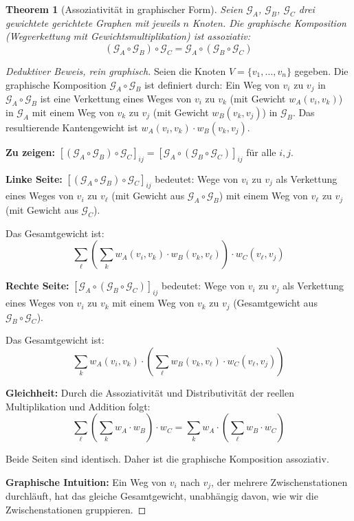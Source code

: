 \documentclass[12pt, a4paper]{article}
\newtheorem{theorem}{Theorem}[section]
\theoremstyle{definition}
\theoremstyle{remark}
\newcommand{\Graph}{\mathcal{G}}
\begin{document}
\begin{theorem}[Assoziativität in graphischer Form]
\label{thm:graph_assoziativitaet}
Seien $\Graph_A$, $\Graph_B$, $\Graph_C$ drei gewichtete gerichtete Graphen mit jeweils $n$ Knoten. Die graphische Komposition (Wegverkettung mit Gewichtsmultiplikation) ist assoziativ:
\[
  (\Graph_A \circ \Graph_B) \circ \Graph_C = \Graph_A \circ (\Graph_B \circ \Graph_C)
\]
\end{theorem}

\begin{proof}[Deduktiver Beweis, rein graphisch]
Seien die Knoten $V = \{v_1, \ldots, v_n\}$ gegeben. Die graphische Komposition $\Graph_A \circ \Graph_B$ ist definiert durch: Ein Weg von $v_i$ zu $v_j$ in $\Graph_A \circ \Graph_B$ ist eine Verkettung eines Weges von $v_i$ zu $v_k$ (mit Gewicht $w_A(v_i, v_k)$) in $\Graph_A$ mit einem Weg von $v_k$ zu $v_j$ (mit Gewicht $w_B(v_k, v_j)$) in $\Graph_B$. Das resultierende Kantengewicht ist $w_A(v_i, v_k) \cdot w_B(v_k, v_j)$.

\textbf{Zu zeigen:} $[(\Graph_A \circ \Graph_B) \circ \Graph_C]_{ij} = [\Graph_A \circ (\Graph_B \circ \Graph_C)]_{ij}$ für alle $i, j$.

\textbf{Linke Seite:} $[(\Graph_A \circ \Graph_B) \circ \Graph_C]_{ij}$ bedeutet: Wege von $v_i$ zu $v_j$ als Verkettung eines Weges von $v_i$ zu $v_\ell$ (mit Gewicht aus $\Graph_A \circ \Graph_B$) mit einem Weg von $v_\ell$ zu $v_j$ (mit Gewicht aus $\Graph_C$).

Das Gesamtgewicht ist:
\[
  \sum_{\ell} \left(\sum_{k} w_A(v_i, v_k) \cdot w_B(v_k, v_\ell)\right) \cdot w_C(v_\ell, v_j)
\]

\textbf{Rechte Seite:} $[\Graph_A \circ (\Graph_B \circ \Graph_C)]_{ij}$ bedeutet: Wege von $v_i$ zu $v_j$ als Verkettung eines Weges von $v_i$ zu $v_k$ mit einem Weg von $v_k$ zu $v_j$ (Gesamtgewicht aus $\Graph_B \circ \Graph_C$).

Das Gesamtgewicht ist:
\[
  \sum_{k} w_A(v_i, v_k) \cdot \left(\sum_{\ell} w_B(v_k, v_\ell) \cdot w_C(v_\ell, v_j)\right)
\]

\textbf{Gleichheit:} Durch die Assoziativität und Distributivität der reellen Multiplikation und Addition folgt:
\[
  \sum_{\ell} \left(\sum_{k} w_A \cdot w_B\right) \cdot w_C = \sum_{k} w_A \cdot \left(\sum_{\ell} w_B \cdot w_C\right)
\]

Beide Seiten sind identisch. Daher ist die graphische Komposition assoziativ.

\textbf{Graphische Intuition:} Ein Weg von $v_i$ nach $v_j$, der mehrere Zwischenstationen durchläuft, hat das gleiche Gesamtgewicht, unabhängig davon, wie wir die Zwischenstationen gruppieren.
\end{proof}
\end{document}
